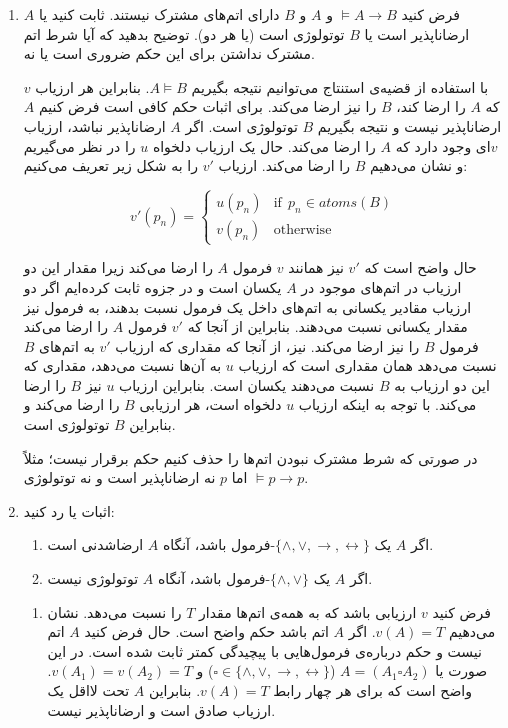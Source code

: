 \documentclass[12pt, 14paper]{article}
\begin{document}
\begin{enumerate}
\item
فرض کنید $\models A\rightarrow B$ و $A$ و $B$ دارای اتم‌های مشترک نیستند. ثابت کنید یا $A$ ارضاناپذیر است یا $B$ توتولوژی است (یا هر دو). توضیح بدهید که آیا شرط اتم مشترک نداشتن برای این حکم ضروری است یا نه.
\begin{ans}
  با استفاده از قضیه‌ی استنتاج می‌توانیم نتیجه بگیریم $A\models B$. بنابراین هر ارزیاب $v$ که $A$ را ارضا کند، $B$ را نیز ارضا می‌کند. برای اثبات حکم کافی است فرض کنیم $A$ ارضاناپذیر نیست و نتیجه بگیریم $B$ توتولوژی است. اگر $A$ ارضاناپذیر نباشد، ارزیاب $v$ای وجود دارد که $A$ را ارضا می‌کند. حال یک ارزیاب دلخواه $u$ را در نظر می‌گیریم و نشان می‌دهیم $B$ را ارضا می‌کند. ارزیاب $v'$ را به شکل زیر تعریف می‌کنیم:

  $$
  v'(p_n)=
  \begin{cases}
  u(p_n) & \text{if}~~p_n\in atoms(B) \\
  v(p_n) & \text{otherwise}
  \end{cases}
  $$

  حال واضح است که $v'$ نیز همانند $v$ فرمول $A$ را ارضا می‌کند زیرا مقدار این دو ارزیاب در اتم‌های موجود در $A$ یکسان است و در جزوه ثابت کرده‌ایم اگر دو ارزیاب مقادیر یکسانی به اتم‌های داخل یک فرمول نسبت بدهند، به فرمول نیز مقدار یکسانی نسبت می‌دهند. بنابراین از آنجا که $v'$ فرمول $A$ را ارضا می‌کند فرمول $B$ را نیز ارضا می‌کند. نیز، از آنجا که مقداری که ارزیاب $v'$ به اتم‌های $B$ نسبت می‌دهد همان مقداری است که ارزیاب $u$ به آن‌ها نسبت می‌دهد، مقداری که این دو ارزیاب به $B$ نسبت می‌دهند یکسان است. بنابراین ارزیاب $u$ نیز $B$ را ارضا می‌کند. با توجه به اینکه ارزیاب $u$ دلخواه است، هر ارزیابی $B$ را ارضا می‌کند و بنابراین $B$ توتولوژی است.

  در صورتی که شرط مشترک نبودن اتم‌ها را حذف کنیم حکم برقرار نیست؛ مثلاً
  $\models p\rightarrow p$
  اما $p$ نه ارضاناپذیر است و نه توتولوژی.
\end{ans}

\item
اثبات یا رد کنید:

\begin{enumerate}
\item
اگر $A$ یک $\{\wedge,\vee,\rightarrow,\leftrightarrow\}$-فرمول باشد، آنگاه $A$ ارضاشدنی است.
\item
اگر $A$ یک $\{\wedge,\vee\}$-فرمول باشد، آنگاه $A$ توتولوژی نیست.
\end{enumerate}\quad\vspace{-9mm}
\begin{ans}
\begin{enumerate}
  \item
  فرض کنید $v$ ارزیابی باشد که به همه‌ی اتم‌ها مقدار $T$ را نسبت می‌دهد. نشان می‌دهیم $v(A)=T$. اگر $A$ اتم باشد حکم واضح است. حال فرض کنید $A$ اتم نیست و حکم درباره‌ی فرمول‌هایی با پیچیدگی کمتر ثابت شده است. در این صورت یا $A=(A_1\square A_2)$ ($\square\in\{\wedge,\vee,\rightarrow,\leftrightarrow\}$) و $v(A_1)=v(A_2)=T$. واضح است که برای هر چهار رابط $v(A)=T$. بنابراین $A$ تحت لااقل یک ارزیاب صادق است و ارضاناپذیر نیست.
  

\end{enumerate}
\end{ans}
\end{enumerate}
\end{document}
